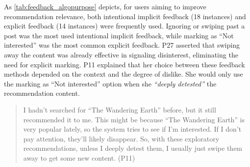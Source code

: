 
As \autoref{tab:feedback_algopurpose} depicts, for users aiming to improve recommendation relevance, both intentional implicit feedback (18 instances) and explicit feedback (14 instances) were frequently used.
Ignoring or swiping past a post was the most used intentional implicit feedback, while marking as ``Not interested'' was the most common explicit feedback. P27 asserted that swiping away the content was already effective in signaling disinterest, eliminating the need for explicit marking. P11 explained that her choice between these feedback methods depended on the context and the degree of dislike. She would only use the marking as ``Not interested'' option when she \textit{``deeply detested''} the recommendation content. 
\begin{quote}
    I hadn't searched for ``The Wandering Earth'' before, but it still recommended it to me. This might be because ``The Wandering Earth'' is very popular lately, so the system tries to see if I'm interested. If I don't pay attention, they'll likely disappear. So, with these exploratory recommendations, unless I deeply detest them, I usually just swipe them away to get some new content. (P11)
\end{quote}

